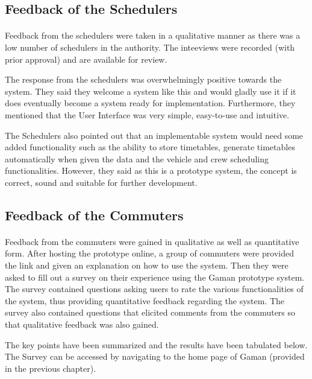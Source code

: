 \subsection{Feedback of the Schedulers}

\paragraph{}Feedback from the schedulers were taken in a qualitative manner as there was a low number of schedulers in the authority. The inteeviews were recorded (with prior approval) and are available for review.

The response from the schedulers was overwhelmingly positive towards the system. They said they welcome a system like this and would gladly use it if it does eventually become a system ready for implementation. Furthermore, they mentioned that the User Interface was very simple, easy-to-use and intuitive.

The Schedulers also pointed out that an implementable system would need some added functionality such as the ability to store timetables, generate timetables automatically when given the data and the vehicle and crew scheduling functionalities. However, they said as this is a prototype system, the concept is correct, sound and suitable for further development.


\subsection{Feedback of the Commuters}

\paragraph{} Feedback from the commuters were gained in qualitative as well as quantitative form. After hosting the prototype online, a group of commuters were provided the link and given an explanation on how to use the system. Then they were asked to fill out a survey on their experience using the Gaman prototype system. The survey contained questions asking users to rate the various functionalities of the system, thus providing quantitative feedback regarding the system. The survey also contained questions that elicited comments from the commuters so that qualitative feedback was also gained.

The key points have been summarized and the results have been tabulated below. The Survey can be accessed by navigating to the home page of Gaman (provided in the previous chapter).


